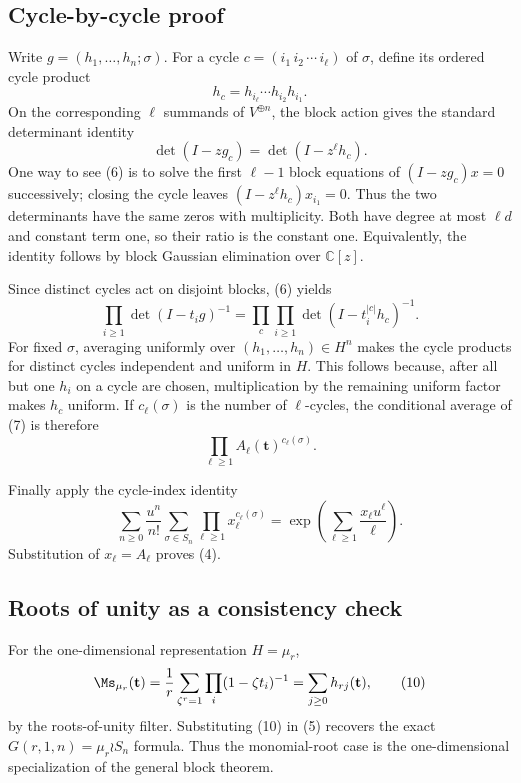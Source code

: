 \documentclass[10pt]{article}
\begin{document}
\subsection{Cycle-by-cycle proof}

Write $g=(h_1,\ldots,h_n;\sigma)$.  For a cycle
$c=(i_1\,i_2\,\cdots\,i_\ell)$ of $\sigma$, define its ordered cycle product
\[
h_c=h_{i_\ell}\cdots h_{i_2}h_{i_1}.
\]
On the corresponding $\ell$ summands of $V^{\oplus n}$, the block action gives
the standard determinant identity
\[
\det(I-zg_c)=\det(I-z^\ell h_c).
\tag{6}
\]
One way to see (6) is to solve the first $\ell-1$ block equations of
$(I-zg_c)x=0$ successively; closing the cycle leaves
$(I-z^\ell h_c)x_{i_1}=0$.  Thus the two determinants have the same zeros
with multiplicity.  Both have degree at most $\ell d$ and constant term one,
so their ratio is the constant one.  Equivalently, the identity follows by
block Gaussian elimination over $\mathbb C[z]$.

Since distinct cycles act on disjoint blocks, (6) yields
\[
\prod_{i\geq1}\det(I-t_i g)^{-1}
=\prod_{c}\prod_{i\geq1}\det(I-t_i^{|c|}h_c)^{-1}.
\tag{7}
\]
For fixed $\sigma$, averaging uniformly over $(h_1,\ldots,h_n)\in H^n$ makes
the cycle products for distinct cycles independent and uniform in $H$.  This
follows because, after all but one $h_i$ on a cycle are chosen, multiplication
by the remaining uniform factor makes $h_c$ uniform.  If $c_\ell(\sigma)$ is
the number of $\ell$-cycles, the conditional average of (7) is therefore
\[
\prod_{\ell\geq1}A_\ell(\mathbf t)^{c_\ell(\sigma)}.
\tag{8}
\]

Finally apply the cycle-index identity
\[
\sum_{n\geq0}\frac{u^n}{n!}\sum_{\sigma\in S_n}
\prod_{\ell\geq1}x_\ell^{c_\ell(\sigma)}
=\exp\!\left(\sum_{\ell\geq1}\frac{x_\ell u^\ell}{\ell}\right).
\tag{9}
\]
Substitution of $x_\ell=A_\ell$ proves (4).

\subsection{Roots of unity as a consistency check}

For the one-dimensional representation $H=\mu_r$,
\[
\Ms_{\mu_r}(\mathbf t)
=\frac1r\sum_{\zeta^r=1}\prod_i(1-\zeta t_i)^{-1}
=\sum_{j\geq0}h_{rj}(\mathbf t),
\tag{10}
\]
by the roots-of-unity filter.  Substituting (10) in (5) recovers the exact
$G(r,1,n)=\mu_r\wr S_n$ formula.  Thus the monomial-root case is the
one-dimensional specialization of the general block theorem.
\end{document}
